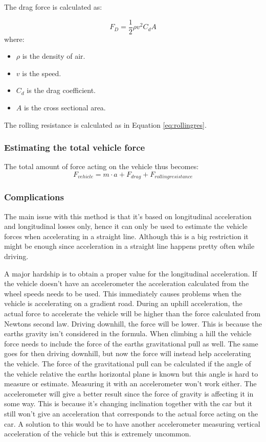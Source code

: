 The drag force is calculated as:

\begin{equation}
F_{D}=\frac{1}{2}\rho v^2 C_{d}A
\end{equation}
where:
\begin{itemize}
	\item $ \rho $ is the density of air.
	\item $ v $ is the speed.
	\item $ C_{d} $ is the drag coefficient.
	\item $ A $ is the cross sectional area.
\end{itemize}
The rolling resistance is calculated as in Equation \ref{eq:rollingres}.

\subsubsection{Estimating the total vehicle force}
The total amount of force acting on the vehicle thus becomes: 
\begin{equation}
\label{eq:newton}
F_{vehicle} = m \cdot a + F_{drag} + F_{rolling resistance}
\end{equation}

\subsubsection{Complications}
The main issue with this method is that it's based on longitudinal acceleration and longitudinal losses only, hence it can only be used to estimate the vehicle forces when accelerating in a straight line. Although this is a big restriction it might be enough since acceleration in a straight line happens pretty often while driving.

A major hardship is to obtain a proper value for the longitudinal acceleration. If the vehicle doesn't have an accelerometer the acceleration calculated from the wheel speeds needs to be used. This immediately causes problems when the vehicle is accelerating on a gradient road. During an uphill acceleration, the actual force to accelerate the vehicle will be higher than the force calculated from Newtons second law. Driving downhill, the force will be lower. This is because the earths gravity isn't considered in the formula. When climbing a hill the vehicle force needs to include the force of the earths gravitational pull as well. The same goes for then driving downhill, but now the force will instead help accelerating the vehicle. The force of the gravitational pull can be calculated if the angle of the vehicle relative the earths horizontal plane is known but this angle is hard to measure or estimate.  Measuring it with an accelerometer won't work either. The accelerometer will give a better result since the force of gravity is affecting it in some way. This is because it's changing inclination together with the car but it still won't give an acceleration that corresponds to the actual force acting on the car. A solution to this would be to have another accelerometer measuring vertical acceleration of the vehicle but this is extremely uncommon.

